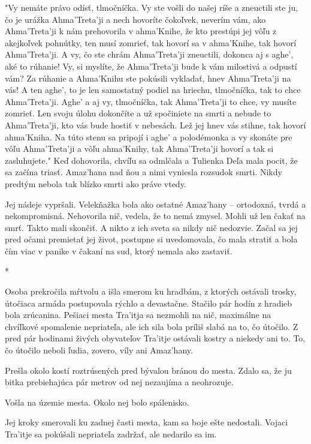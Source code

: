 \documentclass{book}
\begin{document}
"$ $Vy nemáte právo odísť, tlmočníčka. Vy ste vošli do našej ríše a zneuctili ste ju, čo je urážka Ahma'Treta'ji a nech hovoríte čokoľvek, neverím vám, ako Ahma'Treta'ji k nám prehovorila v ahma'Knihe, že kto prestúpi jej vôľu z akejkoľvek pohnútky, ten musí zomrieť, tak hovorí sa v ahma'Knihe, tak hovorí Ahma'Treta'ji. A vy, čo ste chrám Ahma'Treta'ji zneuctili, dokonca aj s aghe', aké to rúhanie! Vy, si myslíte, že Ahma'Treta'ji bude k vám milostivá a odpustí vám? Za rúhanie a Ahma'Knihu ste pokúsili vykladať, hnev Ahma'Treta'ji na vás! A ten aghe', to je len samostatný podiel na hriechu, tlmočníčka, tak to chce Ahma'Treta'ji. Aghe' a aj vy, tlmočníčka, tak Ahma'Treta'ji to chce, vy musíte zomrieť. Len svoju úlohu dokončíte a už spočiniete na smrti a nebude to Ahma'Treta'ji, kto vás bude hostiť v nebesách. Lež jej hnev vás stihne, tak hovorí ahma'Kniha. Na túto stenu sa pripojí i aghe' a polodémonka a vy skonáte pre vôľu Ahma'Treta'ji a vôľu ahma'Knihy, tak Ahma'Treta'ji hovorí a tak si zasluhujete."$ $ Keď dohovorila, chvíľu sa odmlčala a Tulienka Deľa mala pocit, že sa začína triasť. Amaz'hana nad ňou a nimi vyniesla rozsudok smrti. Nikdy predtým nebola tak blízko smrti ako práve vtedy.

Jej nádeje vypršali. Velekňažka bola ako ostatné Amaz'hany – ortodoxná, tvrdá a nekompromisná. Nehovorila nič, vedela, že to nemá zmysel. Mohli už len čakať na smrť. Takto mali skončiť. A nikto z ich sveta sa nikdy nič nedozvie. Začal sa jej pred očami premietať jej život, postupne si uvedomovala, čo mala stratiť a bola čím viac v panike v čakaní na sud, ktorý nemala ako zastaviť.

\begin{center}
*
\end{center}

Osoba prekročila mŕtvolu a išla smerom ku hradbám, z ktorých ostávali trosky, útočiaca armáda postupovala rýchlo a devastačne. Stačilo pár hodín z hradieb bola zrúcanina. Pešiaci mesta Tra'itja sa nezmohli na nič, maximálne na chvíľkové spomalenie nepriateľa, ale ich sila bola príliš slabá na to, čo útočilo. Z pred pár hodinami živých obyvateľov Tra'itje ostávali kostry a niekedy ani to. To, čo útočilo neboli ľudia, zovero, víly ani Amaz'hany.

Prešla okolo kostí roztrúsených pred bývalou bránou do mesta. Zdalo sa, že ju bitka prebiehajúca pár metrov od nej nezaujíma a neohrozuje.

Vošla na územie mesta. Okolo nej bolo spálenisko.

Jej kroky smerovali ku zadnej časti mesta, kam sa boje ešte nedostali. Vojaci Tra'itje sa pokúšali nepriateľa zadržať, ale nedarilo sa im.
\end{document}
